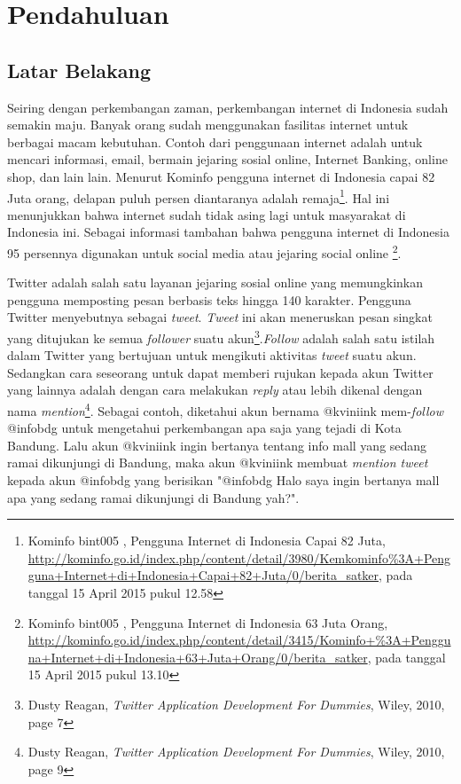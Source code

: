 \chapter{Pendahuluan}
\label{chap:pendahuluan}

\section{Latar Belakang}
\label{sec:latar belakang}

Seiring dengan perkembangan zaman, perkembangan internet di Indonesia sudah semakin maju.  Banyak orang sudah menggunakan fasilitas internet untuk berbagai macam kebutuhan. Contoh dari penggunaan internet adalah untuk mencari informasi, email, bermain jejaring sosial online, Internet Banking, online shop, dan lain lain. Menurut Kominfo pengguna internet di Indonesia capai 82 Juta orang, delapan puluh persen diantaranya adalah remaja\footnote{Kominfo bint005 , Pengguna Internet di Indonesia Capai 82 Juta, \url{http://kominfo.go.id/index.php/content/detail/3980/Kemkominfo\%3A+Pengguna+Internet+di+Indonesia+Capai+82+Juta/0/berita_satker}, pada tanggal 15 April 2015 pukul 12.58}. Hal ini menunjukkan bahwa internet sudah tidak asing lagi untuk masyarakat di Indonesia ini. Sebagai informasi tambahan bahwa pengguna internet di Indonesia 95 persennya digunakan untuk social media atau jejaring social online \footnote{Kominfo bint005 , Pengguna Internet di Indonesia 63 Juta Orang, \url{http://kominfo.go.id/index.php/content/detail/3415/Kominfo+\%3A+Pengguna+Internet+di+Indonesia+63+Juta+Orang/0/berita_satker}, pada tanggal 15 April 2015 pukul 13.10}.

Twitter adalah salah satu layanan jejaring sosial online yang memungkinkan pengguna memposting pesan berbasis teks hingga 140 karakter. Pengguna Twitter menyebutnya sebagai \textit{tweet}. \textit{Tweet} ini akan meneruskan pesan singkat yang ditujukan ke semua \textit{follower} suatu akun\footnote{Dusty Reagan, \textit{Twitter Application Development For Dummies}, Wiley, 2010, page 7}.\textit{Follow} adalah salah satu istilah dalam Twitter yang bertujuan untuk mengikuti aktivitas \textit{tweet} suatu akun. Sedangkan cara seseorang untuk dapat memberi rujukan kepada akun Twitter yang lainnya adalah dengan cara melakukan \textit{reply} atau lebih dikenal dengan nama \textit{mention}\footnote{Dusty Reagan, \textit{Twitter Application Development For Dummies}, Wiley, 2010, page 9}. Sebagai contoh, diketahui akun bernama @kviniink mem-\textit{follow} @infobdg untuk mengetahui perkembangan apa saja yang tejadi di Kota Bandung. Lalu akun @kviniink ingin bertanya tentang info mall yang sedang ramai dikunjungi di Bandung, maka akun @kviniink membuat \textit{mention tweet} kepada akun @infobdg yang berisikan "@infobdg Halo saya ingin bertanya mall apa yang sedang ramai dikunjungi di Bandung yah?".

